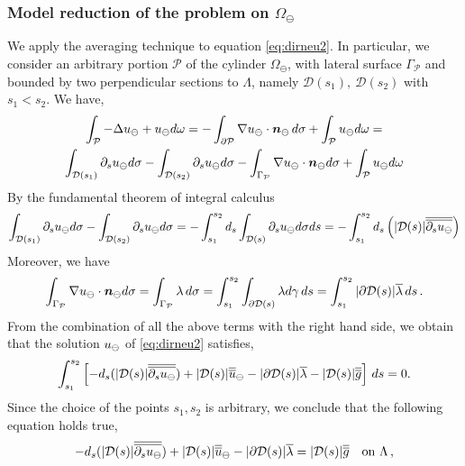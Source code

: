 \subsubsection*{Model reduction of the problem on $\Omega_{\ominus}$}

We apply the averaging technique to equation \eqref{eq:dirneu2}. In particular, we consider an arbitrary portion $\mathcal{P}$ of the cylinder $\Omega_\ominus$, with lateral surface $\Gamma _{\mathcal{P}}$ and bounded by two perpendicular sections to $\Lambda$, namely $\mathcal{D}(s_1), \ \mathcal{D}(s_2)$ with $s_1<s_2$. We have,
\begin{multline*}
\int_{\mathcal{P}} -\Delta u_{\ominus} + u_{\ominus} d\omega =
-\int_{\partial \mathcal{P}} \nabla u_{\ominus} \cdot \boldsymbol n_{\ominus} \, d\sigma  + \int_{\mathcal{P}}u_{\ominus} d\omega=
\\
 \int_{\mathcal{D}(s_1)} \partial_s u_{\ominus} d\sigma -  \int_{\mathcal{D}(s_2)} \partial_s u_{\ominus} d\sigma -  \int_{\Gamma_{\mathcal{P}}} \nabla u_{\ominus} \cdot \boldsymbol n_{\ominus} d\sigma +\int_{\mathcal{P}}u_{\ominus} d\omega
\end{multline*}
By the fundamental theorem of integral calculus 
\begin{equation*}
\int_{\mathcal{D}(s_1)} \partial_s u_{\ominus} d\sigma -  \int_{\mathcal{D}(s_2)} \partial_s u_{\ominus} d\sigma 
= -\int_{s_1}^{s_2} d_s \int_{\mathcal{D}(s)}  \partial_s u_{\ominus} d\sigma ds
= -\int_{s_1}^{s_2} d_s \left( |\mathcal{D}(s)| \overline{\overline{\partial_s u_{\ominus}}} \right)
\end{equation*}
Moreover, we have
\begin{equation*}
\int_{\Gamma_{\mathcal{P}}} \nabla u_{\ominus} \cdot \boldsymbol n_{\ominus} d\sigma =  \int_{\Gamma_{\mathcal{P}}} \lambda \, d\sigma
=  \int_{s_1}^{s_2} \int_{\partial\mathcal{D}(s)} \lambda d\gamma \, ds 
= \int_{s_1}^{s_2} |\partial\mathcal{D}(s)| \overline{\lambda} \,ds\,.
\end{equation*}
From the combination of all the above terms with the right hand side, we obtain that the solution $u_{\ominus}$ of \eqref{eq:dirneu2} satisfies,
\begin{equation*}
\int_{s_1}^{s_2} \left[ 
-d_s (|\mathcal{D}(s)|\overline{\overline{\partial_s u_{\ominus}}}) + |\mathcal{D}(s)|\overline{\overline{u}}_{\ominus} 
- |\partial\mathcal{D}(s)| \overline{\lambda} - |\mathcal{D}(s)| \overline{\overline{g}}
\right]\, ds = 0.
\end{equation*}
Since the choice of the points $s_1,s_2$ is arbitrary, we conclude that the following equation holds true,
\begin{equation}\label{eq:averaged_f}
-d_s (|\D(s)|\avrd{\partial_s \uf}) + |\D(s)|\avrd{u}_{\ominus} 
- |\partial\mathcal{D}(s)| \avrc{\lambda}
= |\mathcal{D}(s)| \avrd{g} \quad \text{on} \ \Lambda\,,
\end{equation}
